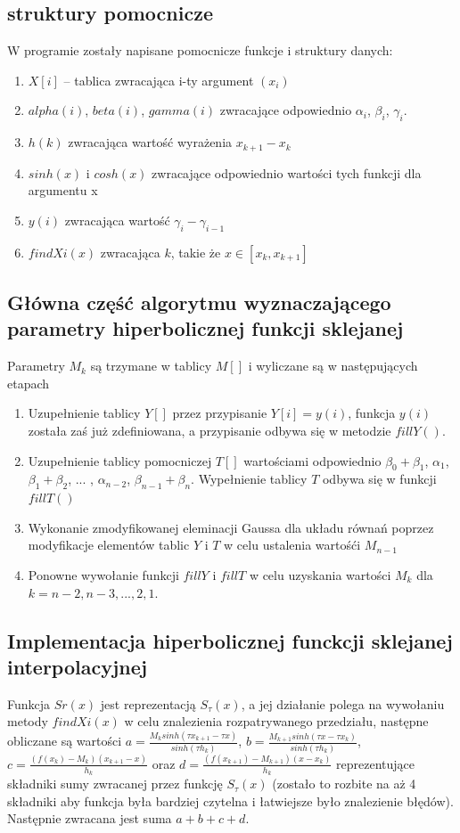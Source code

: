 \documentclass{article}
\begin{document}
\subsection{struktury pomocnicze}
W programie zostały napisane pomocnicze funkcje i struktury danych:
\begin{enumerate}
\item $X[i]$ -- tablica zwracająca i-ty argument $(x_{i})$
\item $alpha(i)$, $beta(i)$, $gamma(i)$ zwracające odpowiednio $\alpha_{i}$, $\beta_{i}$, $\gamma_{i}$. 
\item $h(k)$ zwracająca wartość wyrażenia $x_{k+1}-x_{k}$
\item $sinh(x)$ i $cosh(x)$ zwracające odpowiednio wartości tych funkcji dla argumentu x
\item $y(i)$ zwracająca wartość $\gamma_{i}-\gamma_{i-1}$
\item $findXi(x)$ zwracająca $k$, takie że $x \in [x_{k}, x_{k+1}]$
\end{enumerate}
\subsection{Główna część algorytmu wyznaczającego parametry hiperbolicznej funkcji sklejanej}
Parametry $M_{k}$ są trzymane w tablicy $M[]$ i wyliczane są w następujących etapach
\begin{enumerate}
\item Uzupełnienie tablicy $Y[]$ przez przypisanie $Y[i]=y(i)$, funkcja $y(i)$ została zaś już zdefiniowana, a przypisanie odbywa się w metodzie $fillY()$.
\item Uzupełnienie tablicy pomocniczej $T[]$ wartościami odpowiednio $\beta_{0} + \beta_{1}$, $\alpha_{1}$, $\beta_{1} + \beta_{2}$, ... , $\alpha_{n-2}$, $\beta_{n-1} + \beta_{n}$. Wypełnienie tablicy $T$ odbywa się w funkcji $fillT()$
\item Wykonanie zmodyfikowanej eleminacji Gaussa dla układu równań poprzez modyfikacje elementów tablic $Y$ i $T$ w celu ustalenia wartośći $M_{n-1}$
\item Ponowne wywołanie funkcji $fillY$ i $fillT$ w celu uzyskania wartości $M_{k}$ dla $k = n-2, n-3, ... , 2, 1$. 
\end{enumerate} 
\subsection{Implementacja hiperbolicznej funckcji sklejanej interpolacyjnej}
Funkcja $Sr(x)$ jest reprezentacją $S_{\tau}(x)$, a jej działanie polega na wywołaniu metody $findXi(x)$ w celu znalezienia rozpatrywanego przedziału, następne obliczane są wartości $a = \frac{M_{k}sinh(\tau x_{k+1}-\tau x)}{sinh(\tau h_{k})} $, $b = \frac{M_{k+1}sinh(\tau x - \tau x_{k})}{sinh(\tau h_{k})}$, $c = \frac{(f(x_{k})-M_{k})(x_{k+1}-x)}{h_{k}}$ oraz $d = \frac{(f(x_{k+1})-M_{k+1})(x-x_{k})}{h_{k}}$ reprezentujące składniki sumy zwracanej przez funkcję $S_{\tau}(x)$ (zostało to rozbite na aż 4 składniki aby funkcja była bardziej czytelna i łatwiejsze było znalezienie błędów). Następnie zwracana jest suma $a+b+c+d$.
\end{document}
